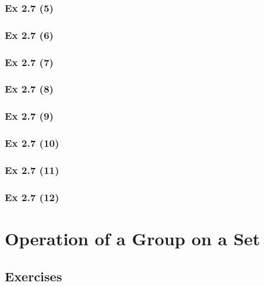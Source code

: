 \subsubsection{Ex 2.7 (5)}\label{sec:Ex_2.7.5}

\subsubsection{Ex 2.7 (6)}\label{sec:Ex_2.7.6}

\subsubsection{Ex 2.7 (7)}\label{sec:Ex_2.7.7}

\subsubsection{Ex 2.7 (8)}\label{sec:Ex_2.7.8}

\subsubsection{Ex 2.7 (9)}\label{sec:Ex_2.7.9}

\subsubsection{Ex 2.7 (10)}\label{sec:Ex_2.7.10}

\newpage		%

\subsubsection{Ex 2.7 (11)}\label{sec:Ex_2.7.11}

\subsubsection{Ex 2.7 (12)}\label{sec:Ex_2.7.12}

\newpage		%

\section{Operation of a Group on a Set}\label{sec:2.8}
\subsection{Exercises}\label{sec:2.8_Exercises}

